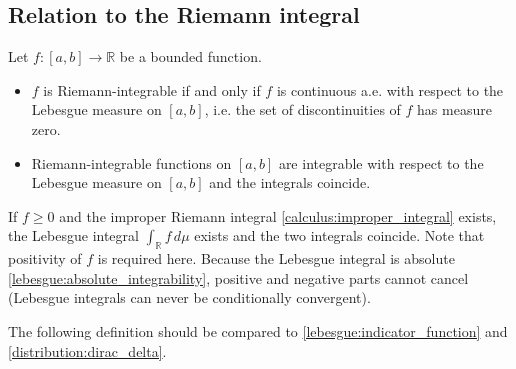 \subsection{Relation to the Riemann integral}

    \begin{property}
        Let $f:[a,b]\rightarrow\mathbb{R}$ be a bounded function.
        \begin{itemize}
            \item $f$ is Riemann-integrable if and only if $f$ is continuous a.e. with respect to the Lebesgue measure on $[a,b]$, i.e. the set of discontinuities of $f$ has measure zero.
            \item Riemann-integrable functions on $[a,b]$ are integrable with respect to the Lebesgue measure on $[a,b]$ and the integrals coincide.
        \end{itemize}
    \end{property}

    \begin{property}
        If $f\geq0$ and the improper Riemann integral \ref{calculus:improper_integral} exists, the Lebesgue integral $\int_{\mathbb{R}}f\,d\mu$ exists and the two integrals coincide. Note that positivity of $f$ is required here. Because the Lebesgue integral is absolute \ref{lebesgue:absolute_integrability}, positive and negative parts cannot cancel (Lebesgue integrals can never be conditionally convergent).
    \end{property}

    The following definition should be compared to \ref{lebesgue:indicator_function} and \ref{distribution:dirac_delta}.

